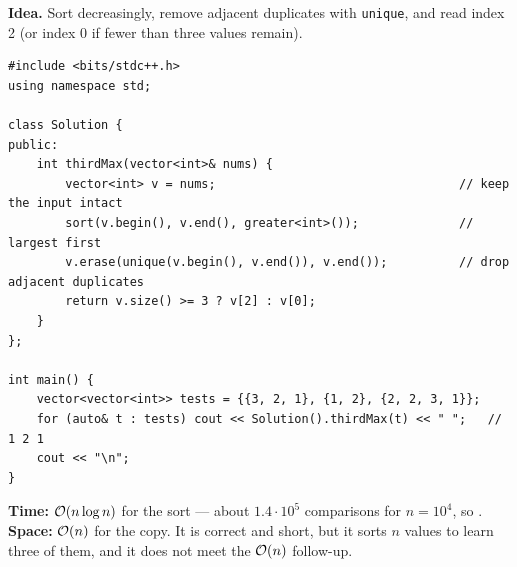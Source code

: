 \begin{bruteforcebox}
\textbf{Idea.} Sort decreasingly, remove adjacent duplicates with \texttt{unique}, and read index 2 (or index 0 if fewer than three values remain).
\begin{lstlisting}[style=cpp]
#include <bits/stdc++.h>
using namespace std;

class Solution {
public:
    int thirdMax(vector<int>& nums) {
        vector<int> v = nums;                                  // keep the input intact
        sort(v.begin(), v.end(), greater<int>());              // largest first
        v.erase(unique(v.begin(), v.end()), v.end());          // drop adjacent duplicates
        return v.size() >= 3 ? v[2] : v[0];
    }
};

int main() {
    vector<vector<int>> tests = {{3, 2, 1}, {1, 2}, {2, 2, 3, 1}};
    for (auto& t : tests) cout << Solution().thirdMax(t) << " ";   // 1 2 1
    cout << "\n";
}
\end{lstlisting}
\begin{complexitybox}
\textbf{Time:} $\mathcal{O}(n \log n)$ for the sort --- about $1.4\cdot10^5$ comparisons for $n = 10^4$, so \ac{}. \textbf{Space:} $\mathcal{O}(n)$ for the copy. It is correct and short, but it sorts $n$ values to learn three of them, and it does not meet the $\mathcal{O}(n)$ follow-up.
\end{complexitybox}
\end{bruteforcebox}

